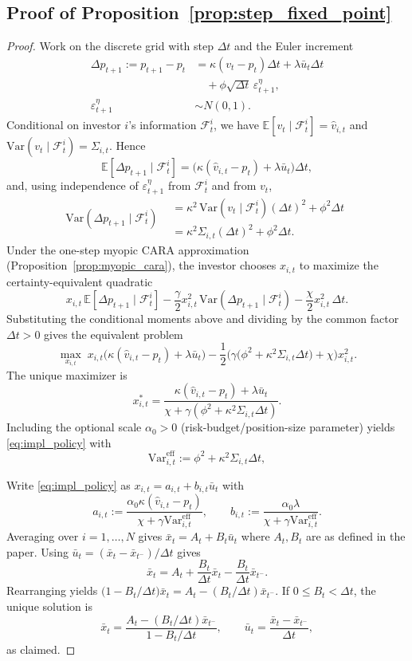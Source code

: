 \subsection*{Proof of Proposition~\ref{prop:step_fixed_point}}
\begin{proof}
Work on the discrete grid with step $\Delta t$ and the Euler increment
\[
\begin{aligned}
\Delta p_{t+1}:=p_{t+1}-p_t
&=\kappa(v_t-p_t)\Delta t+\lambda \bar u_t\Delta t\\
&\quad +\phi\sqrt{\Delta t}\,\varepsilon^\eta_{t+1},\\
\varepsilon^\eta_{t+1}&\sim N(0,1).
\end{aligned}
\]
Conditional on investor $i$'s information $\mathcal F_t^i$, we have $\mathbb E[v_t\mid\mathcal F_t^i]=\hat v_{i,t}$ and
$\mathrm{Var}(v_t\mid\mathcal F_t^i)=\Sigma_{i,t}$. Hence
\[
\mathbb E[\Delta p_{t+1}\mid\mathcal F_t^i]
=\big(\kappa(\hat v_{i,t}-p_t)+\lambda \bar u_t\big)\Delta t,
\]
and, using independence of $\varepsilon^\eta_{t+1}$ from $\mathcal F_t^i$ and from $v_t$,
\[
\mathrm{Var}(\Delta p_{t+1}\mid\mathcal F_t^i)
\begin{aligned}
&=\kappa^2\,\mathrm{Var}(v_t\mid\mathcal F_t^i)(\Delta t)^2+\phi^2\Delta t\\
&=\kappa^2\Sigma_{i,t}(\Delta t)^2+\phi^2\Delta t.
\end{aligned}
\]
Under the one-step myopic CARA approximation (Proposition~\ref{prop:myopic_cara}), the investor chooses $x_{i,t}$ to maximize the certainty-equivalent quadratic
\[
 x_{i,t}\,\mathbb E[\Delta p_{t+1}\mid\mathcal F_t^i]
 -\frac{\gamma}{2}x_{i,t}^2\,\mathrm{Var}(\Delta p_{t+1}\mid\mathcal F_t^i)
 -\frac{\chi}{2}x_{i,t}^2\,\Delta t.
\]
Substituting the conditional moments above and dividing by the common factor $\Delta t>0$ gives the equivalent problem
\[
\max_{x_{i,t}}\;
 x_{i,t}\big(\kappa(\hat v_{i,t}-p_t)+\lambda \bar u_t\big)
 -\frac12\Big(\gamma\big(\phi^2+\kappa^2\Sigma_{i,t}\Delta t\big)+\chi\Big)x_{i,t}^2.
\]
The unique maximizer is
\[
 x_{i,t}^*=\frac{\kappa(\hat v_{i,t}-p_t)+\lambda \bar u_t}{\chi+\gamma(\phi^2+\kappa^2\Sigma_{i,t}\Delta t)}.
\]
Including the optional scale $\alpha_0>0$ (risk-budget/position-size parameter) yields \eqref{eq:impl_policy} with
\[
 \mathrm{Var}^{\mathrm{eff}}_{i,t}:=\phi^2+\kappa^2\Sigma_{i,t}\Delta t,
 \]
 
Write \eqref{eq:impl_policy} as $x_{i,t}=a_{i,t}+b_{i,t}\bar u_t$ with
\[
 a_{i,t}:=\frac{\alpha_0\kappa(\hat v_{i,t}-p_t)}{\chi+\gamma \mathrm{Var}^{\mathrm{eff}}_{i,t}},
 \qquad
 b_{i,t}:=\frac{\alpha_0\lambda}{\chi+\gamma \mathrm{Var}^{\mathrm{eff}}_{i,t}}.
\]
Averaging over $i=1,\dots,N$ gives $\bar x_t=A_t+B_t\bar u_t$ where $A_t,B_t$ are as defined in the paper.
Using $\bar u_t=(\bar x_t-\bar x_{t^-})/\Delta t$ gives
\[
\bar x_t = A_t+\frac{B_t}{\Delta t}\bar x_t-\frac{B_t}{\Delta t}\bar x_{t^-}.
\]
Rearranging yields $\big(1-B_t/\Delta t\big)\bar x_t=A_t-(B_t/\Delta t)\bar x_{t^-}$.
If $0\le B_t<\Delta t$, the unique solution is
\[
\bar x_t=\frac{A_t-(B_t/\Delta t)\bar x_{t^-}}{1-B_t/\Delta t},
\qquad
\bar u_t=\frac{\bar x_t-\bar x_{t^-}}{\Delta t},
\]
as claimed.
\end{proof}

